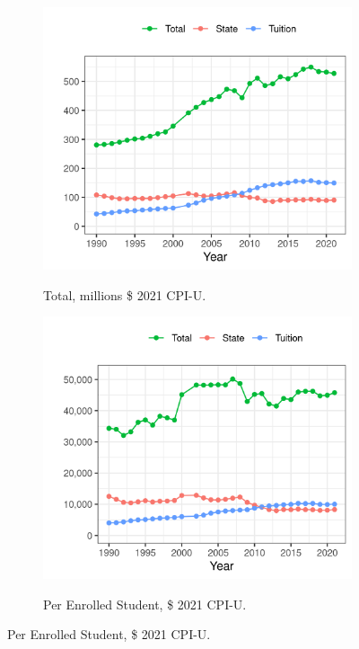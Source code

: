 \documentclass[notitlepage,12pt]{article}
\begin{document}
\begin{figure}[h!]
    \centering
    \singlespacing
    \caption{Mean Total Revenues among Public Universities, by Year.}
    \begin{subfigure}[b]{0.495\textwidth}
        \centering
        \caption{Total, millions \$ 2021 CPI-U.}
        \includegraphics[width=\textwidth]{figures/mean-funding-total.png}
        \label{fig:mean-funding-total}
    \end{subfigure}
    \begin{subfigure}[b]{0.495\textwidth}
        \centering
        \caption{Per Enrolled Student, \$ 2021 CPI-U.}
        \includegraphics[width=\textwidth]{figures/mean-funding-fte.png}
        \label{fig:mean-funding-fte}
    \end{subfigure}
    \label{fig:funding}
\end{figure}
\end{document}
